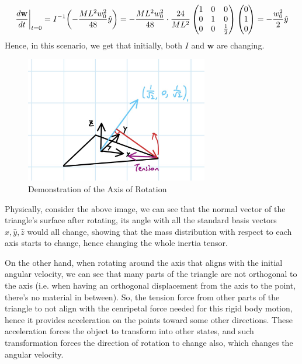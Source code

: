 \documentclass{article}
\DeclarePairedDelimiter{\paran}{(}{)}%
\newcommand{\bw}{\textbf{w}} %
\begin{document}
\begin{align}
    \frac{d\bw}{dt}\bigg|_{t=0} = I^{-1}\paran*{-\frac{ML^2w_0^2}{48}\hat{y}} = -\frac{ML^2w_0^2}{48}\cdot \frac{24}{ML^2}\begin{pmatrix}
        1&0&0\\0&1&0\\0&0&\frac{1}{2}
    \end{pmatrix}\begin{pmatrix}
        0\\1\\0
    \end{pmatrix} = -\frac{w_0^2}{2}\hat{y}
\end{align}
Hence, in this scenario, we get that initially, both $I$ and $\bw$ are changing.

\hfil

\begin{figure}[h!]
    \begin{center}
        \includegraphics[width=80mm]{phys103_q2d.jpg}
        \caption{Demonstration of the Axis of Rotation}
    \end{center}
\end{figure}

Physically, consider the above image, we can see that the normal vector of the triangle's surface after rotating, its angle with all the standard basis vectors $\hat{x},\hat{y},\hat{z}$ would all change, showing that the mass distribution with respect to each axis starts to change, hence changing the whole inertia tensor. 

On the other hand, when rotating around the axis that aligns with the initial angular velocity, we can see that many parts of the triangle are not orthogonal to the axis (i.e. when having an orthogonal displacement from the axis to the point, there's no material in between). So, the tension force from other parts of the triangle to not align with the cenripetal force needed for this rigid body motion, hence it provides acceleration on the points toward some other directions. These acceleration forces the object to transform into other states, and such transformation forces the direction of rotation to change also, which changes the angular velocity.
\end{document}

